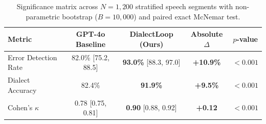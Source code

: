 
\begin{table}[t]
\centering
\small
\caption{Significance matrix across $N=1{,}200$ stratified speech segments with non-parametric bootstrap ($B=10{,}000$) and paired exact McNemar test.}
\label{tab:significance_matrix}
\begin{tabular}{lcccc}
\toprule
\textbf{Metric} & \textbf{GPT-4o Baseline} & \textbf{DialectLoop (Ours)} & \textbf{Absolute $\Delta$} & \textbf{$p$-value} \\
\midrule
Error Detection Rate & 82.0\% [75.2, 88.5] & \textbf{93.0\%} [88.3, 97.0] & \textbf{+10.9\%} & $< 0.001$ \\
Dialect Accuracy     & 82.4\% & \textbf{91.9\%} & \textbf{+9.5\%} & $< 0.001$ \\
Cohen's $\kappa$     & 0.78 [0.75, 0.81] & \textbf{0.90} [0.88, 0.92] & \textbf{+0.12} & $< 0.001$ \\
\bottomrule
\end{tabular}
\end{table}
